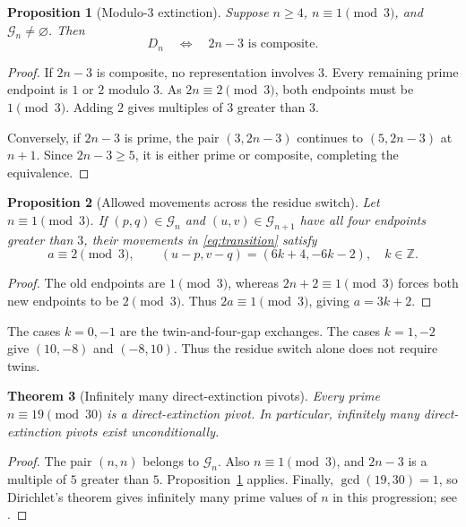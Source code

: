 \documentclass[11pt,a4paper]{article}
\newtheorem{theorem}{Theorem}[section]
\newtheorem{proposition}[theorem]{Proposition}
\theoremstyle{definition}
\theoremstyle{remark}
\newcommand{\G}{\mathcal G}
\begin{document}
\begin{proposition}[Modulo-$3$ extinction]\label{prop:mod3}
Suppose $n\ge4$, $n\equiv1\pmod3$, and $\G_n\ne\varnothing$. Then
\begin{equation}\label{eq:mod3}
 D_n\quad\Longleftrightarrow\quad 2n-3\text{ is composite}.
\end{equation}
\end{proposition}
\begin{proof}
If $2n-3$ is composite, no representation involves $3$. Every remaining prime endpoint is $1$ or $2$ modulo $3$. As $2n\equiv2\pmod3$, both endpoints must be $1\pmod3$. Adding $2$ gives multiples of $3$ greater than $3$.

Conversely, if $2n-3$ is prime, the pair $(3,2n-3)$ continues to $(5,2n-3)$ at $n+1$. Since $2n-3\ge5$, it is either prime or composite, completing the equivalence.
\end{proof}

\begin{proposition}[Allowed movements across the residue switch]\label{prop:movements}
Let $n\equiv1\pmod3$. If $(p,q)\in\G_n$ and $(u,v)\in\G_{n+1}$ have all four endpoints greater than $3$, their movements in \eqref{eq:transition} satisfy
\begin{equation}\label{eq:k}
 a\equiv2\pmod3,\qquad
 (u-p,v-q)=(6k+4,-6k-2),\quad k\in\mathbb Z.
\end{equation}
\end{proposition}
\begin{proof}
The old endpoints are $1\pmod3$, whereas $2n+2\equiv1\pmod3$ forces both new endpoints to be $2\pmod3$. Thus $2a\equiv1\pmod3$, giving $a=3k+2$.
\end{proof}

The cases $k=0,-1$ are the twin-and-four-gap exchanges. The cases $k=1,-2$ give $(10,-8)$ and $(-8,10)$. Thus the residue switch alone does not require twins.

\begin{theorem}[Infinitely many direct-extinction pivots]\label{thm:infiniteD}
Every prime $n\equiv19\pmod{30}$ is a direct-extinction pivot. In particular, infinitely many direct-extinction pivots exist unconditionally.
\end{theorem}
\begin{proof}
The pair $(n,n)$ belongs to $\G_n$. Also $n\equiv1\pmod3$, and $2n-3$ is a multiple of $5$ greater than $5$. Proposition~\ref{prop:mod3} applies. Finally, $\gcd(19,30)=1$, so Dirichlet's theorem gives infinitely many prime values of $n$ in this progression; see \citet[Theorem 17.1]{Sutherland2015}.
\end{proof}
\end{document}
